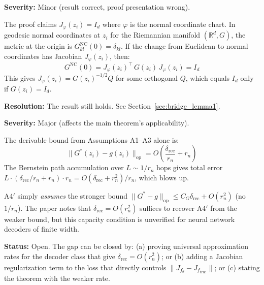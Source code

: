 \documentclass{article}
\begin{document}
\begin{gapbox}
\textbf{Severity:} Minor (result correct, proof presentation wrong).

The proof claims $J_\varphi(z_i) = I_d$ where $\varphi$ is the normal
coordinate chart. In geodesic normal coordinates at $z_i$ for the
Riemannian manifold $(\mathbb{R}^d, G)$, the metric at the origin is
$G^{\text{NC}}_{kl}(0) = \delta_{kl}$. If the change from Euclidean to
normal coordinates has Jacobian $J_\varphi(z_i)$, then:
\[
  G^{\text{NC}}(0) = J_\varphi(z_i)^\top\, G(z_i)\, J_\varphi(z_i) = I_d
\]
This gives $J_\varphi(z_i) = G(z_i)^{-1/2} Q$ for some orthogonal $Q$,
which equals $I_d$ only if $G(z_i) = I_d$.

\textbf{Resolution:} The result still holds. See Section~\ref{sec:bridge_lemma1}.
\end{gapbox}

\begin{gapbox}
\textbf{Severity:} Major (affects the main theorem's applicability).

The derivable bound from Assumptions A1--A3 alone is:
\[
  \|G^*(z_i) - g(z_i)\|_{\text{op}} = O\!\left(\frac{\delta_{\text{rec}}}{r_n} + r_n\right)
\]
The Bernstein path accumulation over $L \sim 1/r_n$ hops gives total error
$L \cdot (\delta_{\text{rec}}/r_n + r_n) \cdot r_n = O(\delta_{\text{rec}} + r_n^2)/r_n$,
which blows up.

A4$'$ simply \textit{assumes} the stronger bound
$\|G^* - g\|_{\text{op}} \leq C_G \delta_{\text{rec}} + O(r_n^2)$ (no $1/r_n$).
The paper notes that $\delta_{\text{rec}} = O(r_n^2)$ suffices to recover A4$'$
from the weaker bound, but this capacity condition is unverified for neural
network decoders of finite width.

\textbf{Status:} Open. The gap can be closed by:
(a) proving universal approximation rates for the decoder class that give
    $\delta_{\text{rec}} = O(r_n^2)$; or
(b) adding a Jacobian regularization term to the loss that directly controls
    $\|J_{f_\theta} - J_{f_{\text{true}}}\|$; or
(c) stating the theorem with the weaker rate.
\end{gapbox}
\end{document}
